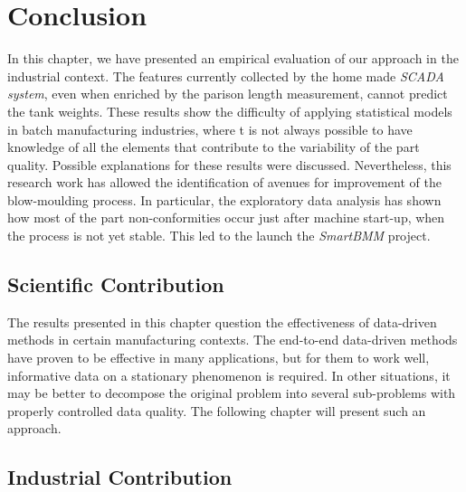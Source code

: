 \section{Conclusion}

In this chapter, we have presented an empirical evaluation of our approach in the industrial context. The features currently collected by the home made \textit{SCADA system}, even when enriched by the parison length measurement, cannot predict the tank weights. These results show the difficulty of applying statistical models in batch manufacturing industries, where t is not always possible to have knowledge of all the elements that contribute to the variability of the part quality. Possible explanations for these results were discussed. Nevertheless, this research work has allowed the identification of avenues for improvement of the blow-moulding process. In particular, the exploratory data analysis has shown how most of the part non-conformities occur just after machine start-up, when the process is not yet stable. This led to the launch the \textit{SmartBMM} project.

\subsection{Scientific Contribution}

The results presented in this chapter question the effectiveness of data-driven methods in certain manufacturing contexts. The end-to-end data-driven methods have proven to be effective in many applications, but for them to work well, informative data on a stationary phenomenon is required. In other situations, it may be better to decompose the original problem into several sub-problems with properly controlled data quality. The following chapter will present such an approach.

\subsection{Industrial Contribution}

